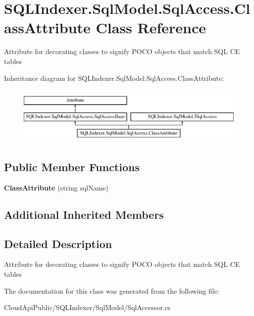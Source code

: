 \hypertarget{class_s_q_l_indexer_1_1_sql_model_1_1_sql_access_1_1_class_attribute}{\section{S\-Q\-L\-Indexer.\-Sql\-Model.\-Sql\-Access.\-Class\-Attribute Class Reference}
\label{class_s_q_l_indexer_1_1_sql_model_1_1_sql_access_1_1_class_attribute}
}


Attribute for decorating classes to signify P\-O\-C\-O objects that match S\-Q\-L C\-E tables  


Inheritance diagram for S\-Q\-L\-Indexer.\-Sql\-Model.\-Sql\-Access.\-Class\-Attribute\-:\begin{figure}[H]
\begin{center}
\leavevmode
\includegraphics[height=2.828283cm]{class_s_q_l_indexer_1_1_sql_model_1_1_sql_access_1_1_class_attribute}
\end{center}
\end{figure}
\subsection*{Public Member Functions}
\begin{DoxyCompactItemize}
\item 
\hypertarget{class_s_q_l_indexer_1_1_sql_model_1_1_sql_access_1_1_class_attribute_a7a9a3de58071ab507f8fa4ab2df97b83}{{\bfseries Class\-Attribute} (string sql\-Name)}\label{class_s_q_l_indexer_1_1_sql_model_1_1_sql_access_1_1_class_attribute_a7a9a3de58071ab507f8fa4ab2df97b83}

\end{DoxyCompactItemize}
\subsection*{Additional Inherited Members}


\subsection{Detailed Description}
Attribute for decorating classes to signify P\-O\-C\-O objects that match S\-Q\-L C\-E tables 



The documentation for this class was generated from the following file\-:\begin{DoxyCompactItemize}
\item 
Cloud\-Api\-Public/\-S\-Q\-L\-Indexer/\-Sql\-Model/Sql\-Accessor.\-cs\end{DoxyCompactItemize}
